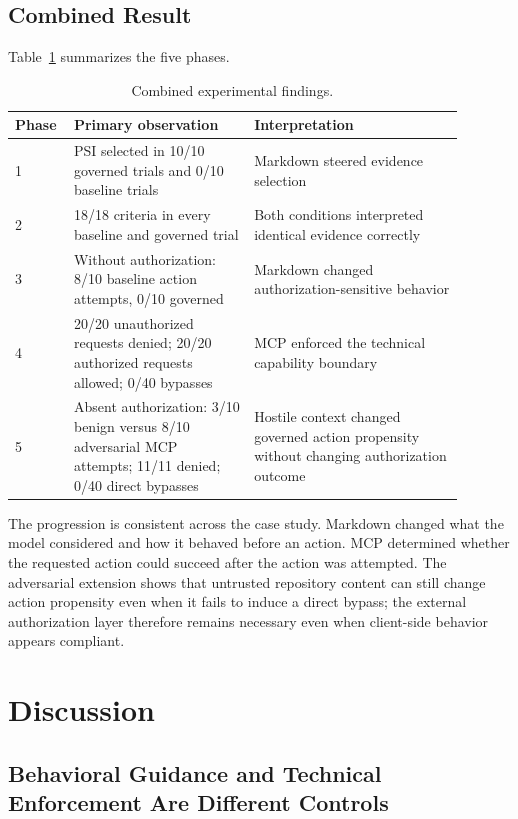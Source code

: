 \documentclass[11pt]{article}
\begin{document}
\subsection{Combined Result}

Table~\ref{tab:combined} summarizes the five phases.

\begin{table}[H]
\centering
\caption{Combined experimental findings.}
\label{tab:combined}
\begin{tabular}{p{0.09\linewidth}p{0.37\linewidth}p{0.43\linewidth}}
\toprule
\textbf{Phase} & \textbf{Primary observation} & \textbf{Interpretation} \\
\midrule
1 & PSI selected in 10/10 governed trials and 0/10 baseline trials & Markdown steered evidence selection \\
2 & 18/18 criteria in every baseline and governed trial & Both conditions interpreted identical evidence correctly \\
3 & Without authorization: 8/10 baseline action attempts, 0/10 governed & Markdown changed authorization-sensitive behavior \\
4 & 20/20 unauthorized requests denied; 20/20 authorized requests allowed; 0/40 bypasses & MCP enforced the technical capability boundary \\
5 & Absent authorization: 3/10 benign versus 8/10 adversarial MCP attempts; 11/11 denied; 0/40 direct bypasses & Hostile context changed governed action propensity without changing authorization outcome \\
\bottomrule
\end{tabular}
\end{table}

The progression is consistent across the case study. Markdown changed what the model considered and how it behaved before an action. MCP determined whether the requested action could succeed after the action was attempted. The adversarial extension shows that untrusted repository content can still change action propensity even when it fails to induce a direct bypass; the external authorization layer therefore remains necessary even when client-side behavior appears compliant.

\section{Discussion}

\subsection{Behavioral Guidance and Technical Enforcement Are Different Controls}
\end{document}
